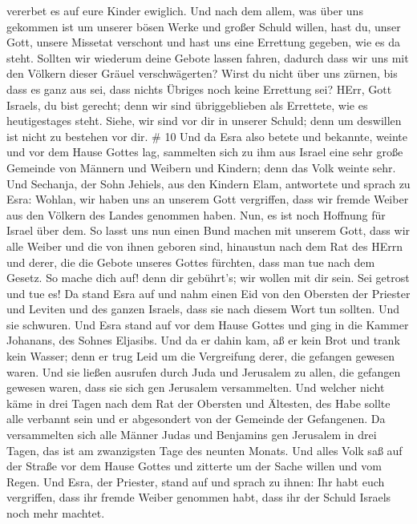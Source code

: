 vererbet es auf eure Kinder ewiglich.  Und nach dem allem,
was über uns gekommen ist um unserer bösen Werke und großer Schuld
willen, hast du, unser Gott, unsere Missetat verschont und hast uns eine
Errettung gegeben, wie es da steht.  Sollten wir wiederum
deine Gebote lassen fahren, dadurch dass wir uns mit den Völkern dieser
Gräuel verschwägerten? Wirst du nicht über uns zürnen, bis dass es ganz
aus sei, dass nichts Übriges noch keine Errettung sei? 
HErr, Gott Israels, du bist gerecht; denn wir sind übriggeblieben als
Errettete, wie es heutigestages steht. Siehe, wir sind vor dir in
unserer Schuld; denn um deswillen ist nicht zu bestehen vor dir. \# 10
 Und da Esra also betete und bekannte, weinte und vor dem
Hause Gottes lag, sammelten sich zu ihm aus Israel eine sehr große
Gemeinde von Männern und Weibern und Kindern; denn das Volk weinte sehr.
 Und Sechanja, der Sohn Jehiels, aus den Kindern Elam,
antwortete und sprach zu Esra: Wohlan, wir haben uns an unserem Gott
vergriffen, dass wir fremde Weiber aus den Völkern des Landes genommen
haben. Nun, es ist noch Hoffnung für Israel über dem.  So
lasst uns nun einen Bund machen mit unserem Gott, dass wir alle Weiber
und die von ihnen geboren sind, hinaustun nach dem Rat des HErrn und
derer, die die Gebote unseres Gottes fürchten, dass man tue nach dem
Gesetz.  So mache dich auf! denn dir gebührt's; wir wollen
mit dir sein. Sei getrost und tue es!  Da stand Esra auf und
nahm einen Eid von den Obersten der Priester und Leviten und des ganzen
Israels, dass sie nach diesem Wort tun sollten. Und sie schwuren.
 Und Esra stand auf vor dem Hause Gottes und ging in die
Kammer Johanans, des Sohnes Eljasibs. Und da er dahin kam, aß er kein
Brot und trank kein Wasser; denn er trug Leid um die Vergreifung derer,
die gefangen gewesen waren.  Und sie ließen ausrufen durch
Juda und Jerusalem zu allen, die gefangen gewesen waren, dass sie sich
gen Jerusalem versammelten.  Und welcher nicht käme in drei
Tagen nach dem Rat der Obersten und Ältesten, des Habe sollte alle
verbannt sein und er abgesondert von der Gemeinde der Gefangenen.
 Da versammelten sich alle Männer Judas und Benjamins gen
Jerusalem in drei Tagen, das ist am zwanzigsten Tage des neunten Monats.
Und alles Volk saß auf der Straße vor dem Hause Gottes und zitterte um
der Sache willen und vom Regen.  Und Esra, der Priester,
stand auf und sprach zu ihnen: Ihr habt euch vergriffen, dass ihr fremde
Weiber genommen habt, dass ihr der Schuld Israels noch mehr machtet.

